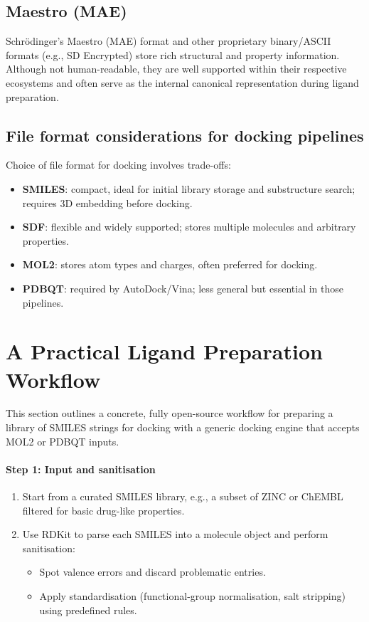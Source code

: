 \documentclass[12pt]{article}
\begin{document}
\subsection{Maestro (MAE)}

Schr\"odinger's Maestro (MAE) format and other proprietary binary/ASCII formats (e.g., SD Encrypted) store rich structural and property information. Although not human-readable, they are well supported within their respective ecosystems and often serve as the internal canonical representation during ligand preparation.

\subsection{File format considerations for docking pipelines}

Choice of file format for docking involves trade-offs:
\begin{itemize}
  \item \textbf{SMILES}: compact, ideal for initial library storage and substructure search; requires 3D embedding before docking.
  \item \textbf{SDF}: flexible and widely supported; stores multiple molecules and arbitrary properties.
  \item \textbf{MOL2}: stores atom types and charges, often preferred for docking.
  \item \textbf{PDBQT}: required by AutoDock/Vina; less general but essential in those pipelines.
\end{itemize}

\section{A Practical Ligand Preparation Workflow}

This section outlines a concrete, fully open-source workflow for preparing a library of SMILES strings for docking with a generic docking engine that accepts MOL2 or PDBQT inputs.

\paragraph{Step 1: Input and sanitisation}

\begin{enumerate}
  \item Start from a curated SMILES library, e.g., a subset of ZINC or ChEMBL filtered for basic drug-like properties.
  \item Use RDKit to parse each SMILES into a molecule object and perform sanitisation:
  \begin{itemize}
    \item Spot valence errors and discard problematic entries.
    \item Apply standardisation (functional-group normalisation, salt stripping) using predefined rules.
  \end{itemize}
\end{enumerate}
\end{document}
